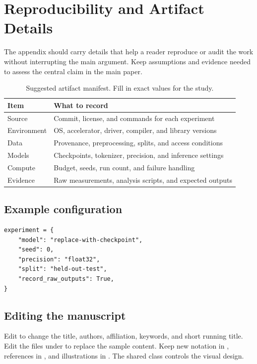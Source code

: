 \section{Reproducibility and Artifact Details}
\label{app:reproducibility}
The appendix should carry details that help a reader reproduce or audit the
work without interrupting the main argument. Keep assumptions and evidence
needed to assess the central claim in the main paper.

\begin{table}[h]
  \caption{Suggested artifact manifest. Fill in exact values for the study.}
  \centering\small
  \begin{tabularx}{\linewidth}{@{}lX@{}}
    \toprule
    \textbf{Item} & \textbf{What to record} \\
    \midrule
    Source & Commit, license, and commands for each experiment \\
    Environment & OS, accelerator, driver, compiler, and library versions \\
    Data & Provenance, preprocessing, splits, and access conditions \\
    Models & Checkpoints, tokenizer, precision, and inference settings \\
    Compute & Budget, seeds, run count, and failure handling \\
    Evidence & Raw measurements, analysis scripts, and expected outputs \\
    \bottomrule
  \end{tabularx}
\end{table}

\subsection{Example configuration}
\begin{lstlisting}[language=STARPython,caption={An illustrative configuration
schema. Values must be chosen for the actual experiment.},label={lst:config}]
experiment = {
    "model": "replace-with-checkpoint",
    "seed": 0,
    "precision": "float32",
    "split": "held-out-test",
    "record_raw_outputs": True,
}
\end{lstlisting}

\subsection{Editing the manuscript}
Edit  to change the title, authors, affiliation,
keywords, and short running title. Edit the files under
 to replace the sample content. Keep new notation in
, references in , and illustrations in
. The shared class controls the visual design.

